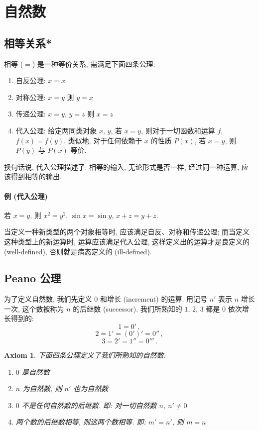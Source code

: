 \documentclass[UTF8]{ctexart}
\theoremstyle{mystyle}
\newtheorem{axiom}{Axiom}[section]
\theoremstyle{myremark}
\theoremstyle{plain}
\begin{document}
\tableofcontents

\newpage
\section{自然数}
\subsection{相等关系*} 
相等 ($ = $) 是一种等价关系, 需满足下面四条公理:
\begin{enumerate}
    \item 自反公理: $ x = x $
    \item 对称公理: $ x = y $ 则 $ y = x $
    \item 传递公理: $ x = y $, $ y = z $ 则 $ x = z $
    \item 代入公理: 给定两同类对象 $ x $, $ y $, 若 $ x = y $, 则对于一切函数和运算 $ f $, $ f(x) = f(y) $. 类似地, 对于任何依赖于 $ x $ 的性质 $ P(x) $, 若 $ x = y $, 则 $ P(y) $ 与 $ P(x) $ 等价.
\end{enumerate}

换句话说, 代入公理描述了: 相等的输入, 无论形式是否一样, 经过同一种运算, 应该得到相等的输出.

\paragraph{例 (代入公理)} 若 $ x = y $, 则 $ x^2 = y^2 $, $ \sin x = \sin y $, $ x + z = y + z $.

当定义一种新类型的两个对象相等时, 应该满足自反、对称和传递公理; 而当定义这种类型上的新运算时, 运算应该满足代入公理, 这样定义出的运算才是良定义的 (well-defined), 否则就是病态定义的 (ill-defined).


\subsection{Peano 公理}
为了定义自然数, 我们先定义 $ 0 $ 和增长 (increment) 的运算. 用记号 $ n' $ 表示 $ n $ 增长一次, 这个数被称为 $ n $ 的后继数 (successor). 我们所熟知的 $ 1 $, $ 2 $, $ 3 $ 都是 $ 0 $ 依次增长得到的:
\[ 1 = 0' \,,\]
\[ 2 = 1' = (0')' = 0'' \,,\]
\[ 3 = 2' = 1'' = 0''' \,.\]

\begin{axiom}
    下面四条公理定义了我们所熟知的自然数:
    \begin{enumerate}
        \item $ 0 $ 是自然数
        \item $ n $ 为自然数, 则 $ n' $ 也为自然数
        \item $ 0 $ 不是任何自然数的后继数. 即: 对一切自然数 $ n $, $ n' \neq 0 $
        \item 两个数的后继数相等, 则这两个数相等. 即: $ m' = n' $, 则 $ m = n $
    \end{enumerate} 
\end{axiom}
\end{document}
